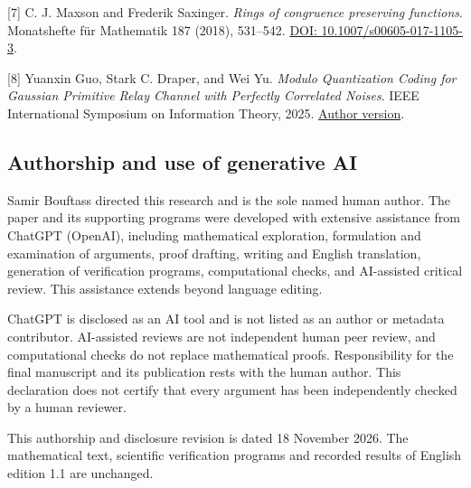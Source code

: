 \documentclass[
]{article}
\begin{document}
{[}7{]} C. J. Maxson and Frederik Saxinger. \emph{Rings of congruence
preserving functions}. Monatshefte für Mathematik 187 (2018), 531--542.
\href{https://doi.org/10.1007/s00605-017-1105-3}{DOI:
10.1007/s00605-017-1105-3}.

{[}8{]} Yuanxin Guo, Stark C. Draper, and Wei Yu. \emph{Modulo
Quantization Coding for Gaussian Primitive Relay Channel with Perfectly
Correlated Noises}. IEEE International Symposium on Information Theory,
2025.
\href{https://www.comm.utoronto.ca/~weiyu/2025_ISIT_Yuanxin.pdf}{Author
version}.

\subsection{Authorship and use of generative
AI}\label{authorship-and-use-of-generative-ai}

Samir Bouftass directed this research and is the sole named human
author. The paper and its supporting programs were developed with
extensive assistance from ChatGPT (OpenAI), including mathematical
exploration, formulation and examination of arguments, proof drafting,
writing and English translation, generation of verification programs,
computational checks, and AI-assisted critical review. This assistance
extends beyond language editing.

ChatGPT is disclosed as an AI tool and is not listed as an author or
metadata contributor. AI-assisted reviews are not independent human peer
review, and computational checks do not replace mathematical proofs.
Responsibility for the final manuscript and its publication rests with
the human author. This declaration does not certify that every argument
has been independently checked by a human reviewer.

This authorship and disclosure revision is dated 18 November 2026. The
mathematical text, scientific verification programs and recorded results
of English edition 1.1 are unchanged.
\end{document}
